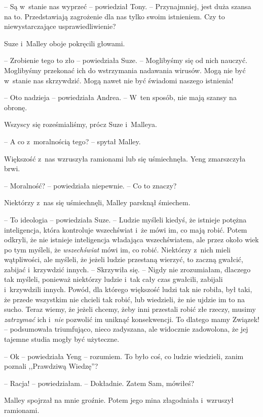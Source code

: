 \documentclass[oneside,polish,11pt,sfheadings]{mwbk}
\begin{document}
-- Są w~stanie nas wyprzeć -- powiedział Tony. -- Przynajmniej, jest duża
szansa na to. Przedstawiają zagrożenie dla nas tylko swoim istnieniem.
Czy to niewystarczające usprawiedliwienie?

Suze i~Malley oboje pokręcili głowami. 

-- Zrobienie tego to zło -- powiedziała Suze. -- Moglibyśmy się od nich nauczyć. Moglibyśmy przekonać
ich do wstrzymania nadawania wirusów. Mogą nie być w~stanie nas
skrzywdzić. Mogą nawet nie być świadomi naszego istnienia!

-- Oto nadzieja -- powiedziała Andrea. -- W~ten sposób, nie mają szansy na
obronę.

Wszyscy się roześmialiśmy, prócz Suze i~Malleya.

-- A co z~moralnością tego? -- spytał Malley.

Większość z~nas wzruszyła ramionami lub się uśmiechnęła. Yeng
zmarszczyła brwi. 

-- Moralność? -- powiedziała niepewnie. -- Co to znaczy?

Niektórzy z~nas się uśmiechnęli, Malley parsknął śmiechem.

-- To ideologia -- powiedziała Suze. -- Ludzie myśleli kiedyś, że istnieje
potężna inteligencja, która kontroluje wszechświat i~że mówi im, co mają
robić. Potem odkryli, że nie istnieje inteligencja władająca
wszechświatem, ale przez około wiek po tym myśleli, że
\textit{wszechświat} mówi im, co robić. Niektórzy z~nich mieli
wątpliwości, ale myśleli, że jeżeli ludzie przestaną wierzyć, to zaczną
gwałcić, zabijać i~krzywdzić innych. -- Skrzywiła się. -- Nigdy nie
zrozumiałam, dlaczego tak myśleli, ponieważ niektórzy ludzie i~tak cały
czas gwałcili, zabijali i~krzywdzili innych. Powód, dla którego
większość ludzi tak nie robiła, był taki, że przede wszystkim nie
chcieli tak robić, lub wiedzieli, że nie ujdzie im to na sucho. Teraz
wiemy, że jeżeli chcemy, żeby inni przestali robić złe rzeczy, musimy
\textit{zatrzymać} ich i~\textit{nie} pozwolić im uniknąć konsekwencji. To
dlatego mamy Związek! -- podsumowała triumfująco, nieco zadyszana, ale
widocznie zadowolona, że jej tajemne studia mogły być użyteczne.

-- Ok -- powiedziała Yeng -- rozumiem. To było coś, co ludzie wiedzieli,
zanim poznali ,,Prawdziwą Wiedzę''?

-- Racja! -- powiedziałam. -- Dokładnie. Zatem Sam, mówiłeś?

Malley spojrzał na mnie groźnie. Potem jego mina złagodniała i~wzruszył
ramionami. 
\end{document}
